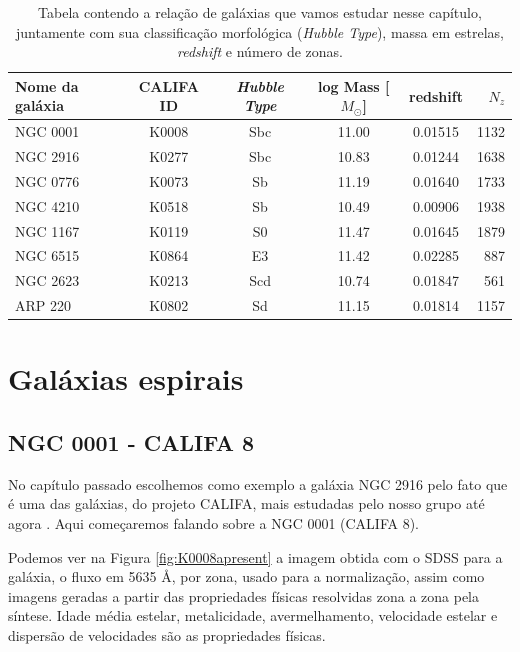 \begin{table}
	\caption[Relação de galáxias do CALIFA usadas neste trabalho.]
	{Tabela contendo a relação de galáxias que vamos estudar nesse capítulo, juntamente com sua classificação morfológica
	({\em Hubble Type}), massa em estrelas, {\em redshift} e número de zonas.}
	\begin{tabular}{l c c c c r}
		Nome da galáxia & CALIFA ID & {\em Hubble Type} & log Mass [$M_\odot$] & redshift & $N_z$ \\
		\midrule
		NGC 0001 & K0008 & Sbc & 11.00 & 0.01515 & 1132 \\
		NGC 2916 & K0277 & Sbc & 10.83 & 0.01244 & 1638 \\
		NGC 0776 & K0073 & Sb  & 11.19 & 0.01640 & 1733 \\
		NGC 4210 & K0518 & Sb  & 10.49 & 0.00906 & 1938 \\
		NGC 1167 & K0119 & S0  & 11.47 & 0.01645 & 1879 \\
		NGC 6515 & K0864 & E3  & 11.42 & 0.02285 & 887  \\
		NGC 2623 & K0213 & Scd & 10.74 & 0.01847 & 561  \\
		ARP 220  & K0802 & Sd  & 11.15 & 0.01814 & 1157 \\
	\end{tabular}
	\label{tab:amostraGalaxias}
\end{table}

\section{Galáxias espirais}
\label{sec:result:spirals}

\subsection{NGC 0001 - CALIFA 8}

No capítulo passado escolhemos como exemplo a galáxia NGC 2916 pelo fato que é uma das galáxias, do projeto CALIFA, mais
estudadas pelo nosso grupo até agora \citep{CidFernandes2013, CidFernandes2014}. Aqui começaremos falando sobre a NGC
0001 (CALIFA 8). 

Podemos ver na Figura \ref{fig:K0008apresent} a imagem obtida com o SDSS para a galáxia, o fluxo em 5635 \AA, por zona,
usado para a normalização, assim como imagens geradas a partir das propriedades físicas resolvidas zona a zona pela
síntese. Idade média estelar, metalicidade, avermelhamento, velocidade estelar e dispersão de velocidades são
as propriedades físicas. 

